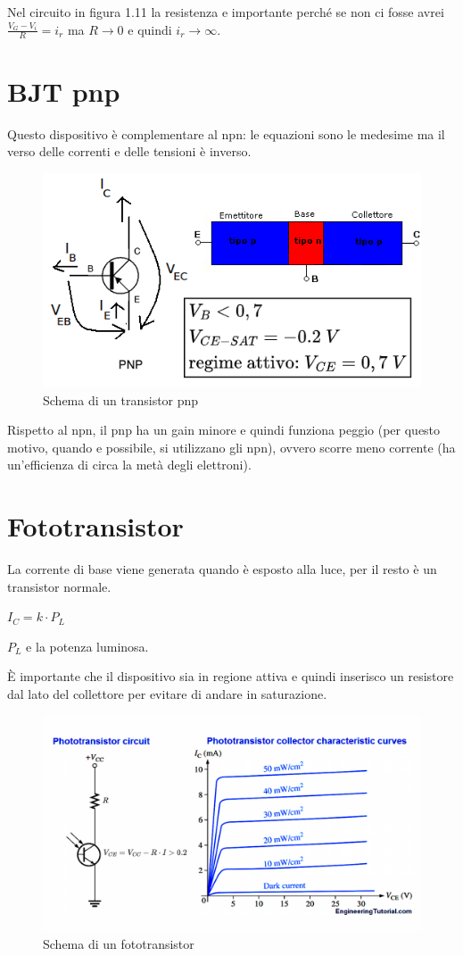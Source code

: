 \documentclass[
]{book}
\begin{document}
Nel circuito in figura 1.11 la resistenza e importante perché se non ci
fosse avrei \(\frac{V_{G}-V_{i}}{R}=i_{r}\) ma \(R\to 0\) e quindi
\(i_{r}\to\infty\).

\section{BJT pnp}\label{bjt-pnp}

Questo dispositivo è complementare al npn: le equazioni sono le medesime
ma il verso delle correnti e delle tensioni è inverso.

\begin{figure}
\centering
\includegraphics[width=0.5\linewidth,height=\textheight,keepaspectratio]{immagini/12.png}
\caption{Schema di un transistor pnp}
\end{figure}

Rispetto al npn, il pnp ha un gain minore e quindi funziona peggio (per
questo motivo, quando e possibile, si utilizzano gli npn), ovvero scorre
meno corrente (ha un'efficienza di circa la metà degli elettroni).

\section{Fototransistor}\label{fototransistor}

La corrente di base viene generata quando è esposto alla luce, per il
resto è un transistor normale.

\(I_{C}=k\cdot P_{L}\)

\(P_{L}\) e la potenza luminosa.

È importante che il dispositivo sia in regione attiva e quindi inserisco
un resistore dal lato del collettore per evitare di andare in
saturazione.

\begin{figure}
\centering
\includegraphics[width=0.5\linewidth,height=\textheight,keepaspectratio]{immagini/13.png}
\caption{Schema di un fototransistor}
\end{figure}
\end{document}
